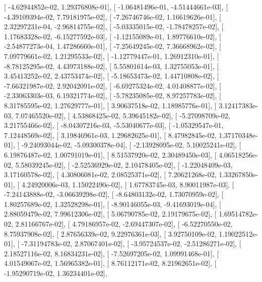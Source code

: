 \documentclass{article}
\begin{document}
       [ -4.62944852e-02,   1.29376808e-01],
       [ -1.06481496e-01,  -4.51444661e-03],
       [ -4.39109394e-02,   7.79181975e-02],
       [ -7.26746746e-02,   1.16619626e-01],
       [  2.32297231e-04,  -2.96814755e-02],
       [ -5.03335015e-02,  -1.78478257e-02],
       [  1.17683328e-02,  -6.15277592e-03],
       [ -1.12155089e-01,   1.89776610e-02],
       [ -2.54877273e-04,   1.47286660e-01],
       [ -7.25649245e-02,   7.36668962e-02],
       [  7.09779661e-02,   1.21295533e-02],
       [ -1.12779447e-01,   1.26912310e-01],
       [ -8.78125295e-02,   4.43973188e-02],
       [  5.55801614e-03,   1.32755053e-01],
       [  3.45413252e-02,   2.43753474e-02],
       [ -5.18653473e-02,   1.44710808e-02],
       [ -7.66321987e-02,   2.92042091e-02],
       [ -6.69275324e-02,   4.01408877e-02],
       [ -2.33063303e-03,   6.19321774e-02],
       [ -5.78235085e-02,   8.97257783e-02],
       [  8.31785595e-02,   1.27629777e-01],
       [  3.90637518e-02,   1.18985776e-01],
       [  3.12417383e-03,   7.07465520e-02],
       [  4.53868425e-02,   5.39645182e-02],
       [ -5.27098709e-02,   3.21755466e-02],
       [ -8.04307216e-03,  -5.53040677e-03],
       [ -1.05329547e-01,   7.12448569e-02],
       [  3.19846961e-03,   1.29682625e-01],
       [  8.47982845e-02,   1.37170348e-01],
       [ -9.24093044e-02,  -5.09300378e-04],
       [ -2.13928095e-02,   5.10025241e-02],
       [  6.19876487e-02,   1.00791019e-01],
       [  8.51537920e-02,   2.30489450e-03],
       [  4.06518256e-02,   5.58039245e-02],
       [ -2.52536929e-02,   2.10478405e-02],
       [ -1.22048409e-03,   3.17160578e-02],
       [  4.30806081e-02,   2.08525371e-02],
       [  7.20621268e-02,   1.33267850e-01],
       [  4.24920006e-03,   1.15022490e-02],
       [  1.67783745e-03,   8.90011987e-03],
       [ -7.24143888e-02,  -3.06639298e-02],
       [ -8.64803132e-02,   1.73070959e-02],
       [  1.80257689e-02,   1.32528298e-01],
       [ -8.90146055e-03,  -9.41693019e-04],
       [  2.88059479e-02,   7.99612306e-02],
       [  5.06790785e-02,   2.19179675e-02],
       [  1.69514782e-02,   2.81166767e-02],
       [  4.79186957e-02,  -2.69447307e-02],
       [ -6.52270550e-02,   8.75937908e-02],
       [  2.87656339e-02,   9.22976361e-03],
       [  3.92750109e-02,   1.19022512e-01],
       [ -7.31194783e-02,   2.87067401e-02],
       [ -3.95724537e-02,  -2.51286271e-02],
       [  2.18527116e-02,   8.16834231e-02],
       [ -7.52697205e-02,   1.09991468e-01],
       [  4.01549067e-02,   1.56965382e-01],
       [  8.76112171e-02,   8.21962651e-02],
       [ -1.95290719e-02,   1.36234401e-02],
\end{document}
